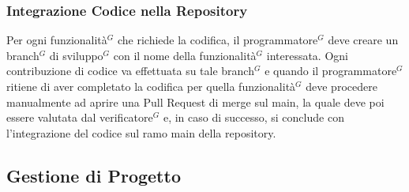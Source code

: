 \documentclass[a4paper,10pt]{article}
\begin{document}
\subsubsection{Integrazione Codice nella Repository}
Per ogni funzionalità$^G$ che richiede la codifica, il programmatore$^G$ deve creare un branch$^G$ di sviluppo$^G$ con il nome
della funzionalità$^G$ interessata. Ogni contribuzione di codice va effettuata su tale branch$^G$ e quando il programmatore$^G$
ritiene di aver completato la codifica per quella funzionalità$^G$ deve procedere manualmente ad aprire una Pull Request
di merge sul main, la quale deve poi essere valutata dal verificatore$^G$ e, in caso di successo, si conclude con  
l'integrazione del codice sul ramo main della repository.
\subsection{Gestione di Progetto}
\end{document}
